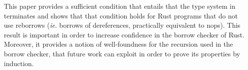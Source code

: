 This paper provides a sufficient condition that entails that the type system
in~\cite{Pearce21} terminates and shows that that condition holds for Rust programs that do not use
reborrows (\textit{ie.} borrows of dereferences, practically equivalent to nops).
This result is important in order to increase confidence in the borrow checker of Rust.
Moreover, it provides a notion of well-foundness for the recursion used in the borrow checker,
that future work can exploit in order to prove its properties by induction.

